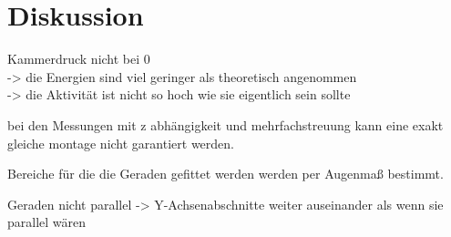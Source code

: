 \section{Diskussion}
\label{sec:Diskussion}


Kammerdruck nicht bei 0 \\
  -> die Energien sind viel geringer als theoretisch angenommen \\
  -> die Aktivität ist nicht so hoch wie sie eigentlich sein sollte

bei den Messungen mit z abhängigkeit und mehrfachstreuung kann eine exakt gleiche montage nicht garantiert werden.


Bereiche für die die Geraden gefittet werden werden per Augenmaß bestimmt.

Geraden nicht parallel -> Y-Achsenabschnitte weiter auseinander als wenn sie parallel wären
